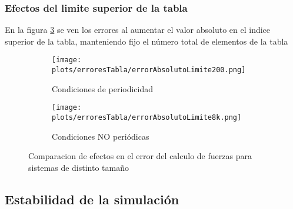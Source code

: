 % 
% 
% 
% 


\subsubsection{Efectos del limite superior de la tabla}

En la figura \ref{time-vs-cut-error-superior} se ven los errores al aumentar el valor absoluto en el indice superior de la tabla, manteniendo fijo el número total de elementos de la tabla 
\begin{figure}[htbp]
\centering
\begin{subfigure}[b]{\plotwidthtres}
   \texttt{[image: plots/erroresTabla/errorAbsolutoLimite200.png]}
   \caption{Condiciones de periodicidad}
   \label{compar-1iter}
 \end{subfigure}
\begin{subfigure}[b]{\plotwidthtres}
   \texttt{[image: plots/erroresTabla/errorAbsolutoLimite8k.png]}
   \caption{Condiciones NO periódicas}
   \label{compar-niter}
 \end{subfigure}
 \caption{Comparacion de efectos en el error del calculo de fuerzas para sistemas de distinto tamaño}
 \label{time-vs-cut-error-superior}
\end{figure}





\subsection{Estabilidad de la simulación}


